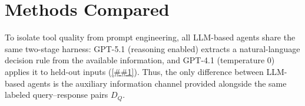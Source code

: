 \documentclass{article} %
\newcommand{\Cref}[1]{\ref{##1}}
\begin{document}


\section{Methods Compared}
\label{sec:methods}


To isolate tool quality from prompt engineering, all LLM-based agents share the same two-stage harness: GPT-5.1 (reasoning enabled) extracts a natural-language decision rule from the available information, and GPT-4.1 (temperature 0) applies it to held-out inputs (\Cref{sec:eval}).
Thus, the only difference between LLM-based agents is the auxiliary information channel provided alongside the same labeled query--response pairs $D_Q$.
\end{document}
